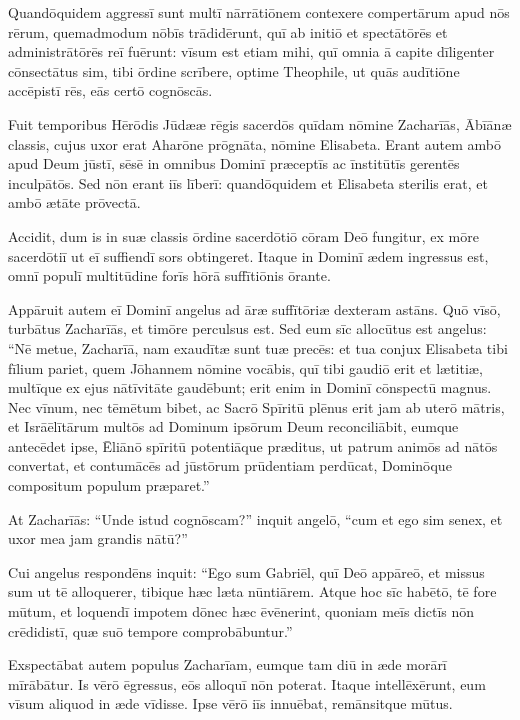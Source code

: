 
\Caput
\Versus Quandōquidem aggressī sunt multī nārrātiōnem contexere compertārum apud nōs rērum,
\Versus quemadmodum nōbīs trādidērunt, quī ab initiō et spectātōrēs et administrātōrēs reī fuērunt:
\Versus vīsum est etiam mihi, quī omnia ā capite dīligenter cōnsectātus sim, tibi ōrdine scrībere, optime Theophile,
\Versus ut quās audītiōne accēpistī rēs, eās certō cognōscās.

\Versus Fuit temporibus Hērōdis Jūdææ rēgis sacerdōs quīdam nōmine Zacharīās, Ābīānæ classis, cujus uxor erat Aharōne prōgnāta, nōmine Elisabeta.
\Versus Erant autem ambō apud Deum jūstī, sēsē in omnibus Dominī præceptīs ac īnstitūtīs gerentēs inculpātōs.
\Versus Sed nōn erant iīs līberī: quandōquidem et Elisabeta sterilis erat, et ambō ætāte prōvectā.

\Versus Accidit, dum is in suæ classis ōrdine sacerdōtiō cōram Deō fungitur,
\Versus ex mōre sacerdōtiī ut eī suffiendī sors obtingeret. Itaque in Dominī ædem ingressus est,
\Versus omnī populī multitūdine forīs hōrā suffītiōnis ōrante.

\Versus Appāruit autem eī Dominī angelus ad āræ suffītōriæ dexteram astāns.
\Versus Quō vīsō, turbātus Zacharīās, et timōre perculsus est.
\Versus Sed eum sīc allocūtus est angelus: ``Nē metue, Zacharīā, nam exaudītæ sunt tuæ precēs: et tua conjux Elisabeta tibi fīlium pariet, quem Jōhannem nōmine vocābis,
\Versus quī tibi gaudiō erit et lætitiæ, multīque ex ejus nātīvitāte gaudēbunt;
\Versus erit enim in Dominī cōnspectū magnus. Nec vīnum, nec tēmētum bibet, ac Sacrō Spīritū plēnus erit jam ab uterō mātris,
\Versus et Isrāēlītārum multōs ad Dominum ipsōrum Deum reconciliābit,
\Versus eumque antecēdet ipse, Ēliānō spīritū potentiāque præditus, ut patrum animōs ad nātōs convertat, et contumācēs ad jūstōrum prūdentiam perdūcat, Dominōque compositum populum præparet.''

\Versus At Zacharīās: ``Unde istud cognōscam?'' inquit angelō, ``cum et ego sim senex, et uxor mea jam grandis nātū?''

\Versus Cui angelus respondēns inquit: ``Ego sum Gabriēl, quī Deō appāreō, et missus sum ut tē alloquerer, tibique hæc læta nūntiārem.
\Versus Atque hoc sīc habētō, tē fore mūtum, et loquendī impotem dōnec hæc ēvēnerint, quoniam meīs dictīs nōn crēdidistī, quæ suō tempore comprobābuntur.''

\Versus Exspectābat autem populus Zacharīam, eumque tam diū in æde morārī mīrābātur.
\Versus Is vērō ēgressus, eōs alloquī nōn poterat. Itaque intellēxērunt, eum vīsum aliquod in æde vīdisse. Ipse vērō iīs innuēbat, remānsitque mūtus.

